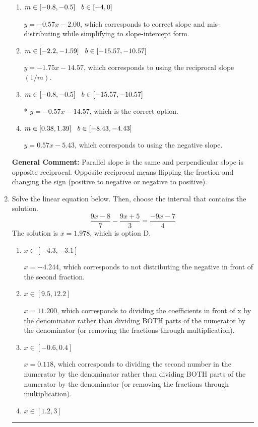 \documentclass{extbook}[14pt]
\newcommand{\litem}[1]{\item #1

\rule{\textwidth}{0.4pt}}
\begin{document}
\begin{enumerate}
{\begin{enumerate}[label=\Alph*.]
 $y = -0.57x + 14.57$, which corresponds to using the correct slope and getting the negative $y$-intercept.
\item \( m \in [-0.8, -0.5] \hspace*{3mm} b \in [-4, 0] \)

 $y = -0.57x - 2.00$, which corresponds to correct slope and mis-distributing while simplifying to slope-intercept form.
\item \( m \in [-2.2, -1.59] \hspace*{3mm} b \in [-15.57, -10.57] \)

 $y = -1.75x - 14.57$, which corresponds to using the reciprocal slope $(1/m)$.
\item \( m \in [-0.8, -0.5] \hspace*{3mm} b \in [-15.57, -10.57] \)

* $y = -0.57x - 14.57$, which is the correct option.
\item \( m \in [0.38, 1.39] \hspace*{3mm} b \in [-8.43, -4.43] \)

 $y = 0.57x - 5.43$, which corresponds to using the negative slope.
\end{enumerate}

\textbf{General Comment:} Parallel slope is the same and perpendicular slope is opposite reciprocal. Opposite reciprocal means flipping the fraction and changing the sign (positive to negative or negative to positive).
}
\litem{
Solve the linear equation below. Then, choose the interval that contains the solution.
\[ \frac{9x -8}{7} - \frac{9x + 5}{3} = \frac{-9x -7}{4} \]The solution is \( x = 1.978 \), which is option D.\begin{enumerate}[label=\Alph*.]
\item \( x \in [-4.3, -3.1] \)

 $x = -4.244$, which corresponds to not distributing the negative in front of the second fraction.
\item \( x \in [9.5, 12.2] \)

 $x = 11.200$, which corresponds to dividing the coefficients in front of x by the denominator rather than dividing BOTH parts of the numerator by the denominator (or removing the fractions through multiplication).
\item \( x \in [-0.6, 0.4] \)

 $x = 0.118$, which corresponds to dividing the second number in the numerator by the denominator rather than dividing BOTH parts of the numerator by the denominator (or removing the fractions through multiplication).
\item \( x \in [1.2, 3] \)


\end{enumerate}}
\end{enumerate}
\end{document}

